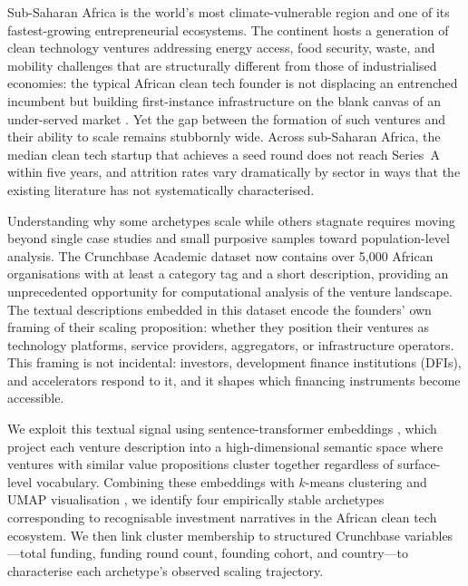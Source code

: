 \documentclass[review,12pt]{elsarticle}
\begin{document}
Sub-Saharan Africa is the world's most climate-vulnerable region and
one of its fastest-growing entrepreneurial ecosystems. The continent
hosts a generation of clean technology ventures addressing energy
access, food security, waste, and mobility challenges that are
structurally different from those of industrialised economies: the
typical African clean tech founder is not displacing an entrenched
incumbent but building first-instance infrastructure on the blank
canvas of an under-served market \citep{kaplinsky2011schumacher,
onsongo2019frugal}. Yet the gap between the formation of such
ventures and their ability to scale remains stubbornly wide. Across
sub-Saharan Africa, the median clean tech startup that achieves a seed
round does not reach Series~A within five years, and attrition rates
vary dramatically by sector in ways that the existing literature has
not systematically characterised.

Understanding why some archetypes scale while others stagnate requires
moving beyond single case studies and small purposive samples toward
population-level analysis. The Crunchbase Academic dataset now
contains over 5,000 African organisations with at least a category
tag and a short description, providing an unprecedented opportunity
for computational analysis of the venture landscape. The textual
descriptions embedded in this dataset encode the founders' own
framing of their scaling proposition: whether they position their
ventures as technology platforms, service providers, aggregators, or
infrastructure operators. This framing is not incidental: investors,
development finance institutions (DFIs), and accelerators respond to
it, and it shapes which financing instruments become accessible.

We exploit this textual signal using sentence-transformer embeddings
\citep{reimers2019sentence}, which project each venture description
into a high-dimensional semantic space where ventures with similar
value propositions cluster together regardless of surface-level
vocabulary. Combining these embeddings with $k$-means clustering and
UMAP visualisation \citep{mcinnes2018umap}, we identify four
empirically stable archetypes corresponding to recognisable investment
narratives in the African clean tech ecosystem. We then link cluster
membership to structured Crunchbase variables---total funding, funding
round count, founding cohort, and country---to characterise each
archetype's observed scaling trajectory.
\end{document}
